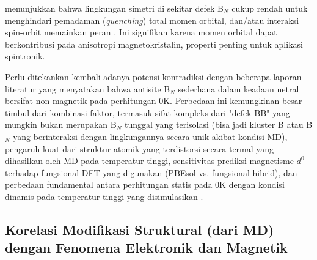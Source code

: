 \begin{itemize}
menunjukkan bahwa lingkungan simetri di sekitar defek B$_N$ cukup rendah untuk menghindari pemadaman (\textit{quenching}) total momen orbital, dan/atau interaksi spin-orbit memainkan peran . Ini signifikan karena momen orbital dapat berkontribusi pada anisotropi magnetokristalin, properti penting untuk aplikasi spintronik. \end{itemize}
Perlu ditekankan kembali adanya potensi kontradiksi dengan beberapa laporan literatur yang menyatakan bahwa antisite B$_N$ sederhana dalam keadaan netral bersifat non-magnetik pada perhitungan 0K. Perbedaan ini kemungkinan besar timbul dari kombinasi faktor, termasuk sifat kompleks dari "defek BB" yang mungkin bukan merupakan B$_N$ tunggal yang terisolasi (bisa jadi kluster B atau B$_N$ yang berinteraksi dengan lingkungannya secara unik akibat kondisi MD), pengaruh kuat dari struktur atomik yang terdistorsi secara termal yang dihasilkan oleh MD pada temperatur tinggi, sensitivitas prediksi magnetisme $d^0$ terhadap fungsional DFT yang digunakan (PBEsol vs. fungsional hibrid), dan perbedaan fundamental antara perhitungan statis pada 0K dengan kondisi dinamis pada temperatur tinggi yang disimulasikan . \subsection{Korelasi Modifikasi Struktural (dari MD) dengan Fenomena Elektronik dan Magnetik}
\label{subsec:korelasi_struktur_md_dft}

